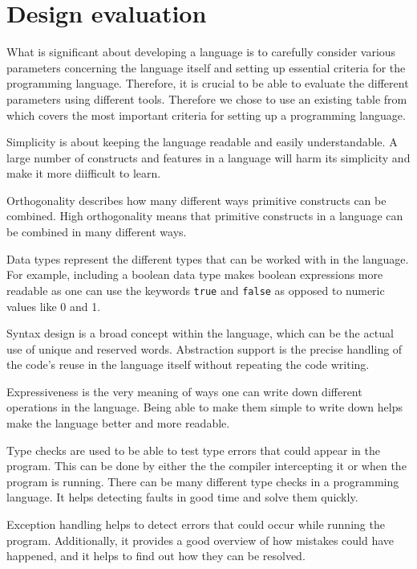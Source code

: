 \section{Design evaluation} \label{chap:design evaluation}
What is significant about developing a language is to carefully consider various parameters concerning the language itself and setting up essential criteria for the programming language. 
Therefore, it is crucial to be able to evaluate the different parameters using different tools. Therefore we chose to use an existing table from \cite{sebesta_concepts_2016} which covers the most important criteria for setting up a programming language. 


Simplicity is about keeping the language readable and easily understandable. A large number of constructs and features in a language will harm its simplicity and make it more diifficult to learn.

Orthogonality describes how many different ways primitive constructs can be combined. High orthogonality means that primitive constructs in a language can be combined in many different ways. 

Data types represent the different types that can be worked with in the language. For example, including a boolean data type makes boolean expressions more readable as one can use the keywords \texttt{true} and \texttt{false} as opposed to numeric values like 0 and 1.

Syntax design is a broad concept within the language, which can be the actual use of unique and reserved words.
Abstraction support is the precise handling of the code's reuse in the language itself without repeating the code writing.

Expressiveness is the very meaning of ways one can write down different operations in the language. Being able to make them simple to write down helps make the language better and more readable.

Type checks are used to be able to test type errors that could appear in the program. This can be done by either the the compiler intercepting it or when the program is running. There can be many different type checks in a programming language. It helps detecting faults in good time and solve them quickly.

Exception handling helps to detect errors that could occur while running the program. Additionally, it provides a good overview of how mistakes could have happened, and it helps to find out how they can be resolved.


